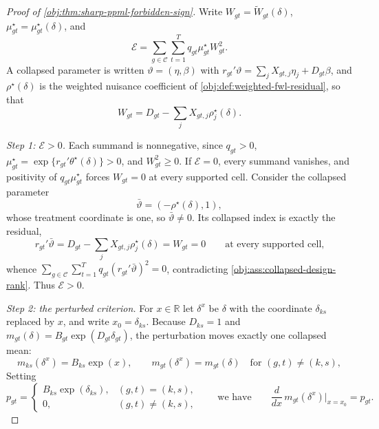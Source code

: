 \begin{proof}[Proof of \cref{obj:thm:sharp-ppml-forbidden-sign}]
Write \(W_{gt}=\widetilde W_{gt}(\delta)\), \(\mu^\star_{gt}=\mu^\star_{gt}(\delta)\), and
\[
\mathcal E=\sum_{g\in\mathcal C}\sum_{t=1}^T q_{gt}\mu^\star_{gt}W_{gt}^2 .
\]
A collapsed parameter is written \(\vartheta=(\eta,\beta)\) with \(r_{gt}'\vartheta=\sum_jX_{gt,j}\eta_j+D_{gt}\beta\), and \(\rho^\star(\delta)\) is the weighted nuisance coefficient of \cref{obj:def:weighted-fwl-residual}, so that
\[
W_{gt}=D_{gt}-\sum_jX_{gt,j}\rho^\star_j(\delta).
\]

\textit{Step 1: \(\mathcal E>0\).} Each summand is nonnegative, since \(q_{gt}>0\), \(\mu^\star_{gt}=\exp\{r_{gt}'\theta^\star(\delta)\}>0\), and \(W_{gt}^2\ge0\). If \(\mathcal E=0\), every summand vanishes, and positivity of \(q_{gt}\mu^\star_{gt}\) forces \(W_{gt}=0\) at every supported cell. Consider the collapsed parameter
\[
\bar\vartheta=(-\rho^\star(\delta),1),
\]
whose treatment coordinate is one, so \(\bar\vartheta\neq0\). Its collapsed index is exactly the residual,
\[
r_{gt}'\bar\vartheta=D_{gt}-\sum_jX_{gt,j}\rho^\star_j(\delta)=W_{gt}=0
\qquad\text{at every supported cell,}
\]
whence \(\sum_{g\in\mathcal C}\sum_{t=1}^T q_{gt}(r_{gt}'\bar\vartheta)^2=0\), contradicting \cref{obj:ass:collapsed-design-rank}. Thus \(\mathcal E>0\).

\textit{Step 2: the perturbed criterion.} For \(x\in\mathbb R\) let \(\delta^x\) be \(\delta\) with the coordinate \(\delta_{ks}\) replaced by \(x\), and write \(x_0=\delta_{ks}\). Because \(D_{ks}=1\) and \(m_{gt}(\delta)=B_{gt}\exp(D_{gt}\delta_{gt})\), the perturbation moves exactly one collapsed mean:
\[
m_{ks}(\delta^x)=B_{ks}\exp(x),
\qquad
m_{gt}(\delta^x)=m_{gt}(\delta)\quad\text{for }(g,t)\neq(k,s),
\]
Setting
\[
p_{gt}=
\begin{cases}
B_{ks}\exp(\delta_{ks}), & (g,t)=(k,s),\\
0, & (g,t)\neq(k,s),
\end{cases}
\qquad\text{we have}\qquad
\frac{d}{dx}\,m_{gt}(\delta^x)\Big|_{x=x_0}=p_{gt}.
\]


\end{proof}
